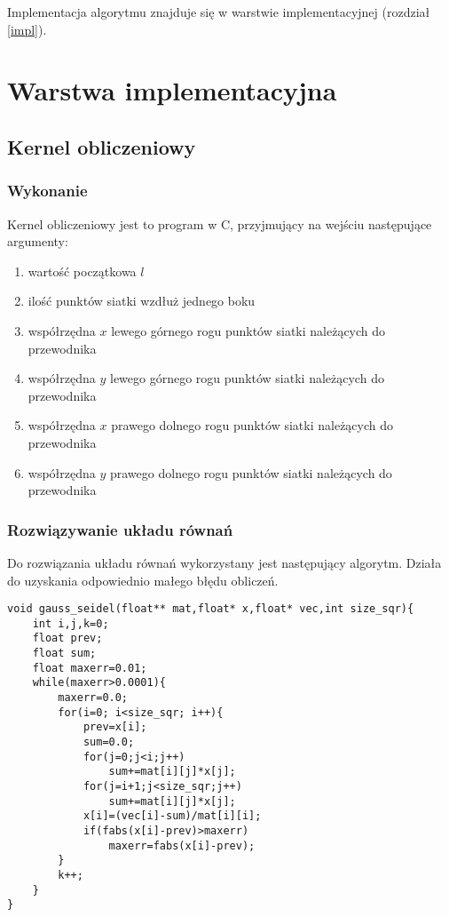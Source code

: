 \documentclass{article}
\begin{document}
Implementacja algorytmu znajduje się w warstwie implementacyjnej (rozdział \ref{impl}).

\section{Warstwa implementacyjna}
\subsection{Kernel obliczeniowy}
\subsubsection{Wykonanie}
Kernel obliczeniowy jest to program w C, przyjmujący na wejściu następujące argumenty: \\
\begin{enumerate}
   \item wartość początkowa $l$
   \item ilość punktów siatki wzdłuż jednego boku
   \item współrzędna $x$ lewego górnego rogu punktów siatki należących do przewodnika
   \item współrzędna $y$ lewego górnego rogu punktów siatki należących do przewodnika
   \item współrzędna $x$ prawego dolnego rogu punktów siatki należących do przewodnika
   \item współrzędna $y$ prawego dolnego rogu punktów siatki należących do przewodnika
\end{enumerate}

\subsubsection{Rozwiązywanie układu równań}
Do rozwiązania układu równań wykorzystany jest następujący algorytm. Działa do uzyskania
odpowiednio małego błędu obliczeń.
\label{impl}
\begin{lstlisting}
void gauss_seidel(float** mat,float* x,float* vec,int size_sqr){
	int i,j,k=0;
	float prev;
	float sum;
	float maxerr=0.01;
	while(maxerr>0.0001){
		maxerr=0.0;
		for(i=0; i<size_sqr; i++){
			prev=x[i];
			sum=0.0;
			for(j=0;j<i;j++)
				sum+=mat[i][j]*x[j];
			for(j=i+1;j<size_sqr;j++)
				sum+=mat[i][j]*x[j];
			x[i]=(vec[i]-sum)/mat[i][i];
			if(fabs(x[i]-prev)>maxerr)
				maxerr=fabs(x[i]-prev);
		}
		k++;
	}
}
\end{lstlisting} 
\end{document}
